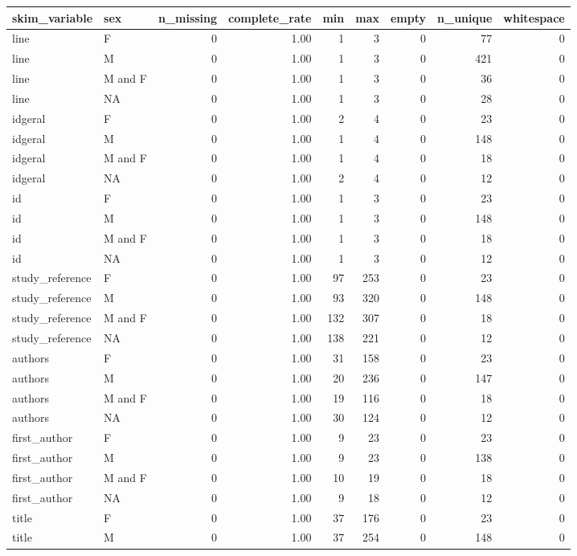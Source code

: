 \documentclass[
]{article}
\begin{document}
\begin{longtable}[]{@{}llrrrrrrr@{}}
\toprule
skim\_variable & sex & n\_missing & complete\_rate & min & max & empty &
n\_unique & whitespace \\
\midrule
\endhead
line & F & 0 & 1.00 & 1 & 3 & 0 & 77 & 0 \\
line & M & 0 & 1.00 & 1 & 3 & 0 & 421 & 0 \\
line & M and F & 0 & 1.00 & 1 & 3 & 0 & 36 & 0 \\
line & NA & 0 & 1.00 & 1 & 3 & 0 & 28 & 0 \\
idgeral & F & 0 & 1.00 & 2 & 4 & 0 & 23 & 0 \\
idgeral & M & 0 & 1.00 & 1 & 4 & 0 & 148 & 0 \\
idgeral & M and F & 0 & 1.00 & 1 & 4 & 0 & 18 & 0 \\
idgeral & NA & 0 & 1.00 & 2 & 4 & 0 & 12 & 0 \\
id & F & 0 & 1.00 & 1 & 3 & 0 & 23 & 0 \\
id & M & 0 & 1.00 & 1 & 3 & 0 & 148 & 0 \\
id & M and F & 0 & 1.00 & 1 & 3 & 0 & 18 & 0 \\
id & NA & 0 & 1.00 & 1 & 3 & 0 & 12 & 0 \\
study\_reference & F & 0 & 1.00 & 97 & 253 & 0 & 23 & 0 \\
study\_reference & M & 0 & 1.00 & 93 & 320 & 0 & 148 & 0 \\
study\_reference & M and F & 0 & 1.00 & 132 & 307 & 0 & 18 & 0 \\
study\_reference & NA & 0 & 1.00 & 138 & 221 & 0 & 12 & 0 \\
authors & F & 0 & 1.00 & 31 & 158 & 0 & 23 & 0 \\
authors & M & 0 & 1.00 & 20 & 236 & 0 & 147 & 0 \\
authors & M and F & 0 & 1.00 & 19 & 116 & 0 & 18 & 0 \\
authors & NA & 0 & 1.00 & 30 & 124 & 0 & 12 & 0 \\
first\_author & F & 0 & 1.00 & 9 & 23 & 0 & 23 & 0 \\
first\_author & M & 0 & 1.00 & 9 & 23 & 0 & 138 & 0 \\
first\_author & M and F & 0 & 1.00 & 10 & 19 & 0 & 18 & 0 \\
first\_author & NA & 0 & 1.00 & 9 & 18 & 0 & 12 & 0 \\
title & F & 0 & 1.00 & 37 & 176 & 0 & 23 & 0 \\
title & M & 0 & 1.00 & 37 & 254 & 0 & 148 & 0 \\

\end{longtable}
\end{document}

